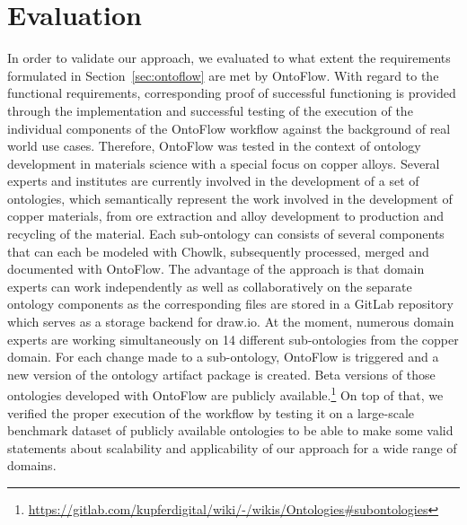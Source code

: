 \documentclass[runningheads]{llncs}
\begin{document}
\section{Evaluation}\label{sec:eval}
In order to validate our approach, we evaluated to what extent the requirements formulated in Section~\ref{sec:ontoflow} are met by OntoFlow. With regard to the functional requirements, corresponding proof of successful functioning is provided through the implementation and successful testing of the execution of the individual components of the OntoFlow workflow against the background of real world use cases. Therefore, OntoFlow was tested in the context of ontology development in materials science with a special focus on copper alloys. Several experts and institutes are currently involved in the development of a set of ontologies, which semantically represent the work involved in the development of copper materials, from ore extraction and alloy development to production and recycling of the material. Each sub-ontology can consists of several components that can each be modeled with Chowlk, subsequently processed, merged and documented with OntoFlow. The advantage of the approach is that domain experts can work independently as well as collaboratively on the separate ontology components as the corresponding files are stored in a GitLab repository which  serves as a storage backend for draw.io. At the moment, numerous domain experts are working simultaneously on 14 different sub-ontologies from the copper domain. For each change made to a sub-ontology, OntoFlow is triggered and a new version of the ontology artifact package is created. Beta versions of those ontologies developed with OntoFlow are publicly available.\footnote{\url{https://gitlab.com/kupferdigital/wiki/-/wikis/Ontologies#subontologies}}
On top of that, we verified the proper execution of the workflow by testing it on a large-scale benchmark dataset of publicly available ontologies to be able to make some valid statements about scalability and applicability of our approach for a wide range of domains.
\end{document}
